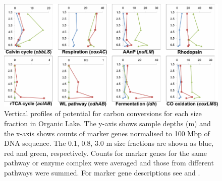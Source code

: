 \begin{figure}
\includegraphics[width=\textwidth]{orglake_figures/c_cycle.pdf}
\caption[Vertical profiles of potential for carbon cycling in Organic Lake]{Vertical profiles of potential for carbon conversions for each size fraction in Organic Lake. The y-axis shows sample depths (m) and the x-axis shows counts of marker genes normalised to 100 Mbp of \textsc{DNA} sequence. The 0.1, 0.8, 3.0 \textmu{}m size fractions are shown as blue, red and green, respectively. Counts for marker genes for the same pathway or enzyme complex were averaged and those from different pathways were summed. For marker gene descriptions see  and .}
\label{fig:c_cycle}

\end{figure}
